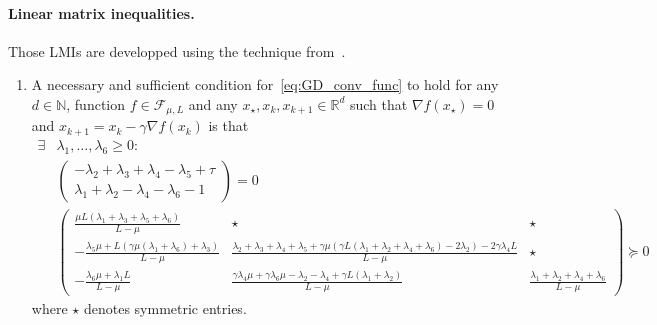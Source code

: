 \documentclass{article}
\renewcommand{\geq}{\geqslant}
\renewcommand{\succeq}{\succcurlyeq}
\begin{document}
\paragraph{Linear matrix inequalities.} Those LMIs are developped using the technique from~\cite{taylor2017smooth}.
\begin{enumerate}
	\item A necessary and sufficient condition for~\eqref{eq:GD_conv_func} to hold for any $d\in\mathbb{N}$, function $f\in\mathcal{F}_{\mu,L}$ and any $x_\star,x_k,x_{k+1}\in\mathbb{R}^d$ such that $\nabla f(x_\star)=0$ and $x_{k+1}=x_k-\gamma\nabla f(x_k)$ is that
	\begin{equation*}
\begin{aligned}
\exists &\lambda_1,\ldots,\lambda_6\geq 0:\\
&\begin{pmatrix}
-\lambda_2+\lambda_3+\lambda_4-\lambda_5+\tau\\\lambda_1+\lambda_2-\lambda_4-\lambda_6-1
\end{pmatrix}=0\\
&\begin{pmatrix}
 \frac{\mu  L (\lambda_1+\lambda_3+\lambda_5+\lambda_6)}{L-\mu } & \star &  \star \\
 -\frac{\lambda_5 \mu +L (\gamma  \mu  (\lambda_1+\lambda_6)+\lambda_3)}{L-\mu} & \frac{\lambda_2+\lambda_3+\lambda_4+\lambda_5+\gamma  \mu  (\gamma  L (\lambda_1+\lambda_2+\lambda_4+\lambda_6)-2 \lambda_2)-2 \gamma  \lambda_4 L}{L-\mu } & \star \\
 -\frac{\lambda_6 \mu +\lambda_1 L}{L-\mu } & \frac{\gamma  \lambda_4 \mu +\gamma  \lambda_6 \mu -\lambda_2-\lambda_4+\gamma  L (\lambda_1+\lambda_2)}{L-\mu } & \frac{\lambda_1+\lambda_2+\lambda_4+\lambda_6}{L-\mu }
\end{pmatrix}\succeq 0
\end{aligned}
\end{equation*}
where $\star$ denotes symmetric entries.


\end{enumerate}
\end{document}
